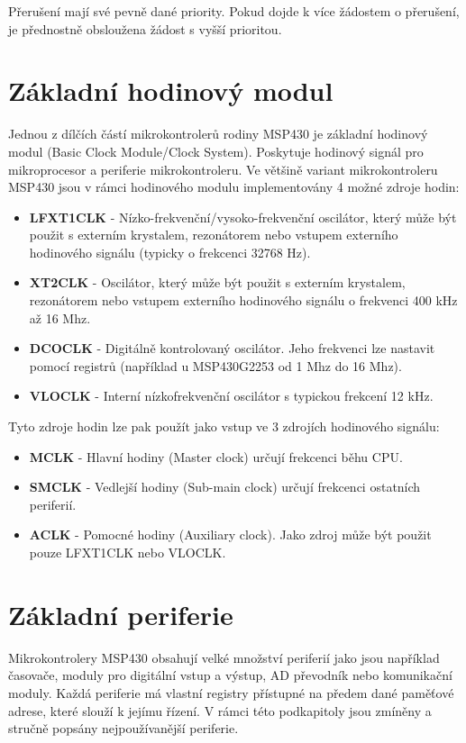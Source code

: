 Přerušení mají své pevně dané priority. Pokud dojde k více žádostem o přerušení, je přednostně obsloužena žádost s vyšší prioritou.

\section{Základní hodinový modul}

Jednou z dílčích částí mikrokontrolerů rodiny MSP430 je základní hodinový modul (Basic Clock Module/Clock System). Poskytuje hodinový signál pro mikroprocesor a periferie mikrokontroleru. Ve většině variant mikrokontroleru MSP430 jsou v rámci hodinového modulu implementovány 4 možné zdroje hodin:

\begin{itemize}
\item \textbf{LFXT1CLK} - Nízko-frekvenční/vysoko-frekvenční oscilátor, který může být použit s externím krystalem, rezonátorem nebo vstupem externího hodinového signálu (typicky o frekcenci 32768 Hz).
\item \textbf{XT2CLK} - Oscilátor, který může být použit s externím krystalem, rezonátorem nebo vstupem externího hodinového signálu o frekvenci 400 kHz až 16 Mhz.
\item \textbf{DCOCLK} - Digitálně kontrolovaný oscilátor. Jeho frekvenci lze nastavit pomocí registrů (například u MSP430G2253 od 1 Mhz do 16 Mhz).
\item \textbf{VLOCLK} - Interní nízkofrekvenční oscilátor s typickou frekcení 12 kHz.
\end{itemize}

Tyto zdroje hodin lze pak použít jako vstup ve 3 zdrojích hodinového signálu:

\begin{itemize}
\item \textbf{MCLK} - Hlavní hodiny (Master clock) určují frekcenci běhu CPU.
\item \textbf{SMCLK} - Vedlejší hodiny (Sub-main clock) určují frekcenci ostatních periferií.
\item \textbf{ACLK} - Pomocné hodiny (Auxiliary clock). Jako zdroj může být použit pouze LFXT1CLK nebo VLOCLK.
\end{itemize}

\section{Základní periferie}

Mikrokontrolery MSP430 obsahují velké množství periferií jako jsou například časovače, moduly pro digitální vstup a výstup, AD převodník nebo komunikační moduly. Každá periferie má vlastní registry přístupné na předem dané paměťové adrese, které slouží k jejímu řízení. V rámci této podkapitoly jsou zmíněny a stručně popsány nejpoužívanější periferie.

